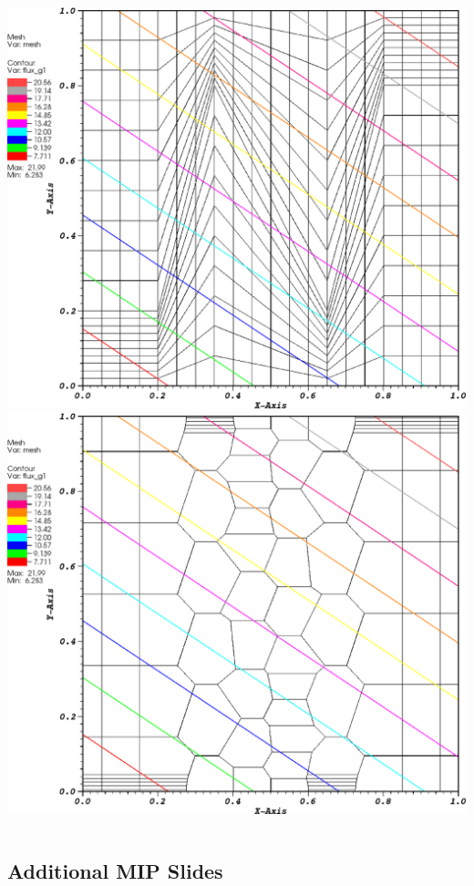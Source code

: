 \documentclass[compress,10pt]{beamer}
\begin{document}
\begin{frame}[t]
{\begin{columns}
{}\includegraphics[width=0.95\columnwidth]{images/z_quad_MAXENT_k1.eps} \\
\vspace{3mm}
{}\includegraphics[width=0.95\columnwidth]{images/z_poly_MAXENT_k1.eps} 
\end{columns}
}
\end{frame}
\subsection{Additional MIP Slides}
\end{document}
